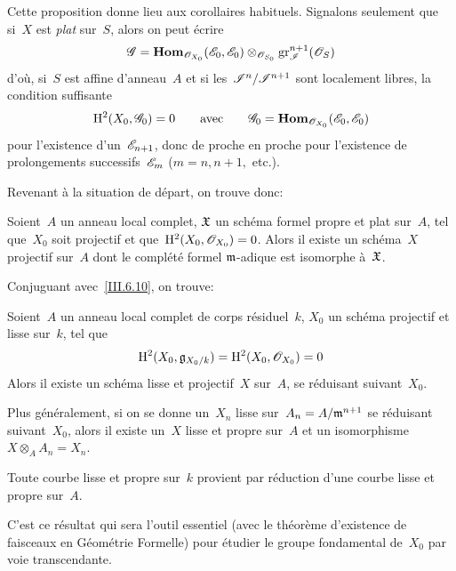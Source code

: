 Cette proposition donne lieu aux corollaires habituels. Signalons
seulement que si~$X$ est \emph{plat} sur~$S$, alors on peut \'ecrire
$$
\cal{G}= \SheafHom_{\cal{O}_{X_0}}(\cal{E}_0, \cal{E}_0)
\otimes_{\cal{O}_{S_0}} \gr_{\cal{I}}^{n+1}(\cal{O}_S)
$$
d'o\`u, si~$S$ est affine d'anneau~$A$ et si
les~$\cal{I}^n/\cal{I}^{n+1}$ sont localement libres, la condition
suffisante
$$
\H^2(X_0,\cal{G}_0)=0 \qquad\text{avec}\qquad
\cal{G}_0=\SheafHom_{\cal{O}_{X_0}}(\cal{E}_0, \cal{E}_0)
$$
pour l'existence d'un~$\cal{E}_{n+1}$, donc de proche en proche pour
l'existence de prolongements successifs~$\cal{E}_m$ ($m=n,n+1,$
etc.).

Revenant \`a la situation de d\'epart, on trouve donc:

\begin{proposition}\label{III.7.2}
Soient~$A$ un anneau local complet, $\mathfrak{X}$ un sch\'ema formel
propre et plat sur~$A$, tel que~$X_0$ soit projectif et
que~$\H^2(X_0,\cal{O}_{X_0})=0$. Alors il existe un sch\'ema~$X$
projectif sur~$A$ dont le compl\'et\'e formel $\mathfrak{m}$-adique
est isomorphe \`a~$\mathfrak{X}$.
\end{proposition}

Conjuguant avec~\ref{III.6.10}, on trouve:

\begin{theoreme}\label{III.7.3}
Soient~$A$ un anneau local complet de corps r\'esiduel~$k$, $X_0$ un
sch\'ema projectif et lisse sur~$k$, tel que
$$
\H^2(X_0,\goth{g}_{X_0/k})=\H^2(X_0,\cal{O}_{X_0})=0
$$
Alors il existe un sch\'ema lisse et projectif~$X$ sur~$A$, se
r\'eduisant suivant~$X_0$.
\end{theoreme}

Plus g\'en\'eralement, si on se donne un~$X_n$ lisse
sur~$A_n=A/\mathfrak{m}^{n+1}$ se r\'eduisant suivant~$X_0$, alors il
existe un~$X$ lisse et propre sur~$A$ et un
isomorphisme~$X\otimes_AA_n=X_n$.

\begin{corollaire}\label{III.7.4}
Toute courbe lisse et propre sur~$k$ provient par r\'eduction d'une
courbe lisse et propre sur~$A$.
\end{corollaire}

C'est ce r\'esultat qui sera l'outil essentiel (avec le
th\'eor\`eme d'existence de faisceaux en G\'eom\'etrie
Formelle) pour \'etudier le groupe fondamental de~$X_0$ par voie
transcendante.

